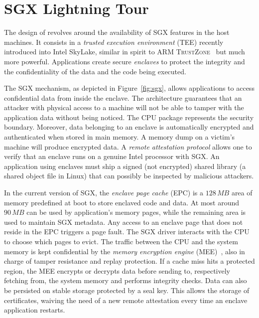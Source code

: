 \section{SGX Lightning Tour}\label{sec:background}

The design of \SYS{} revolves around the availability of SGX features in the host machines.
It consists in a \emph{trusted execution environment} (TEE) recently introduced into Intel{\textregistered} SkyLake, similar in spirit to ARM \textsc{TrustZone}~\cite{arm2009security} but much more powerful.
Applications create secure \emph{enclaves} to protect the integrity and the confidentiality of the data and the code being executed.

The SGX mechanism, as depicted in Figure~\ref{fig:sgx}, allows applications to access confidential data from inside the enclave.
The architecture guarantees that an attacker with physical access to a machine will not be able to tamper with the application data without being noticed.
The CPU package represents the security boundary.
Moreover, data belonging to an enclave is automatically encrypted and authenticated when stored in main memory.
A memory dump on a victim’s machine will produce encrypted data.
A \emph{remote attestation protocol} allows one to verify that an enclave runs on a genuine Intel{\textregistered} processor with SGX.
An application using enclaves must ship a signed (not encrypted) shared library (a shared object file in Linux) that can possibly be inspected by malicious attackers.

In the current version of SGX, the \emph{enclave page cache} (EPC) is a $128\,MB$ area of memory predefined at boot to store enclaved code and data.
At most around $90\,MB$ can be used by application’s memory pages, while the remaining area is used to maintain SGX metadata.
Any access to an enclave page that does not reside in the EPC triggers a page fault.
The SGX driver interacts with the CPU to choose which pages to evict.
The traffic between the CPU and the system memory is kept confidential by the \emph{memory encryption engine} (MEE)~\cite{gueron2016memory}, also in charge of tamper resistance and replay protection.
If a cache miss hits a protected region, the MEE encrypts or decrypts data before sending to, respectively fetching from, the system memory and performs integrity checks.
Data can also be persisted on stable storage protected by a seal key.
This allows the storage of certificates, waiving the need of a new remote attestation every time an enclave application restarts.

